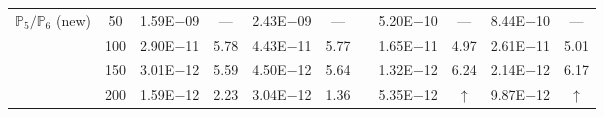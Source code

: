 \begin{table}[H]
{\begin{tabular}{@{}l c c c c c c c c c c@{}}
\midrule
\multirow{4}{*}{$\mathbb{P}_{5}/\mathbb{P}_{6}$ (new)}
 & 50 & 1.59E$-$09 & ---  & 2.43E$-$09 & --- &  & 5.20E$-$10 & --- & 8.44E$-$10 & ---\\
 & 100 & 2.90E$-$11 & 5.78  & 4.43E$-$11 & 5.77 &  & 1.65E$-$11 & 4.97 & 2.61E$-$11 & 5.01\\
 & 150 & 3.01E$-$12 & 5.59  & 4.50E$-$12 & 5.64 &  & 1.32E$-$12 & 6.24 & 2.14E$-$12 & 6.17\\
 & 200 & 1.59E$-$12 & 2.23  & 3.04E$-$12 & 1.36 &  & 5.35E$-$12 & $\uparrow$ & 9.87E$-$12 & $\uparrow$\\
\bottomrule
\end{tabular}}
\label{none}
\end{table}
